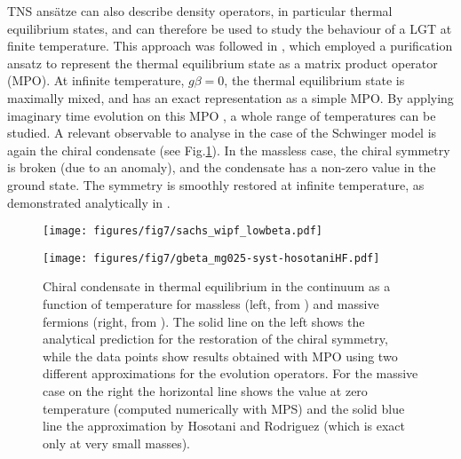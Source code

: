 \documentclass[epj,final]{svjour}
\begin{document}
TNS ans\"atze can also describe density operators, in particular thermal equilibrium states, and can therefore be used to study the behaviour of a LGT at finite temperature. This approach was followed in  \cite{Banuls2015,banuls2016thermalmass}, which employed a purification ansatz \cite{Verstraete2004a}  to represent the thermal equilibrium state as a matrix product operator (MPO). At infinite temperature, $g\beta=0$, the thermal equilibrium state is maximally mixed, and has an exact representation as a simple MPO. By applying imaginary time evolution on this MPO \cite{Verstraete2004a,Zwolak2004}, a whole range of temperatures can be studied. A relevant observable to analyse in the case of the Schwinger model is again the chiral condensate (see Fig.\ref{fig:thermal}). In the massless case, the chiral symmetry is broken (due to an anomaly), and the condensate has a non-zero value in the ground state. The symmetry is smoothly restored at infinite temperature, as demonstrated analytically in \cite{Sachs:1991en}.

\begin{figure}
\begin{minipage}[b]{.4\columnwidth}
\texttt{[image: figures/fig7/sachs\_wipf\_lowbeta.pdf]}
\end{minipage}
\hspace{.02\columnwidth}
\begin{minipage}[b]{.4\columnwidth} 
\texttt{[image: figures/fig7/gbeta\_mg025-syst-hosotaniHF.pdf]}
\end{minipage}
\caption{
Chiral condensate in thermal equilibrium in the continuum as a function of temperature for massless (left, from \cite{Banuls2015}) and massive fermions (right, from \cite{banuls2016thermalmass}). The solid line on the left shows the analytical prediction for the restoration of the chiral symmetry, while the data points show results obtained with MPO using two different approximations for the evolution operators. For the massive case on the right the horizontal line shows the value at zero temperature (computed numerically with MPS) and the solid blue line the approximation by Hosotani and Rodriguez \cite{Hosotani1998} (which is exact only at very small masses).}
\label{fig:thermal}
\end{figure}
\end{document}

